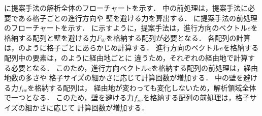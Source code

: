 に提案手法の解析全体のフローチャートを示す．
中の前処理は，提案手法に必要である格子ごとの進行方向や
壁を避ける力を算出する．
に提案手法の前処理のフローチャートを示す．
に示すように，提案手法は，進行方向のベクトル$e$を
格納する配列と壁を避ける力$F_W$を格納する配列が必要となる．
各配列の計算は，のように格子ごとにあらかじめ計算する．
進行方向のベクトル$e$を格納する配列中の要素は，のように経由地ごとに
違うため，それぞれの経由地で計算する必要となる．
このため，進行方向ベクトル$e$を格納する配列の前処理は，経由地数の多さや
格子サイズの細かさに応じて計算回数が増加する．
中の壁を避ける力$f_{iw}$を格納する配列は，
経由地が変わっても変化しないため，解析領域全体で一つとなる．
このため，壁を避ける力$f_{iw}$を格納する配列の前処理は，格子サイズの細かさに応じて
計算回数が増加する．


